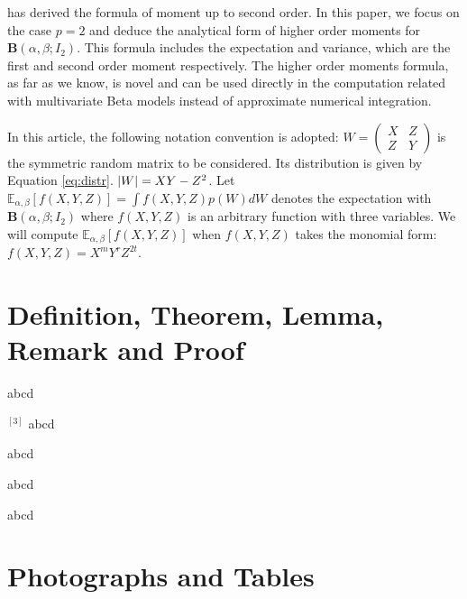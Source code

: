 \documentclass[twoside]{article}%
\DeclarePairedDelimiter\abs{\lvert}{\rvert}
\def\E{\mathbb{E}}
\begin{document}
\cite{konno_1988}
has derived the formula of moment up to second order.
In this paper, we focus on the case $p=2$ and deduce the analytical form of 
higher order moments for $\mathbf{B}(\alpha, \beta; I_2)$.
This formula
includes the expectation and variance, which are the first and second
order moment respectively. The higher order moments formula, as
far as we know, is novel and can be used directly in the computation
related with multivariate Beta models instead of approximate
numerical integration.

In this article, the following notation convention is adopted:
$W=\begin{pmatrix} X & Z \\ Z & Y \end{pmatrix}$ is the symmetric random
matrix to be considered. Its distribution is given by Equation \eqref{eq:distr}.
$\abs{W}=XY-Z^2$.
Let $\E_{\alpha,\beta}[f(X,Y, Z)] = \int f(X,Y,Z)p(W)dW$ denotes the expectation
with $\mathbf{B}(\alpha, \beta;I_2)$ where $f(X, Y, Z)$ is an arbitrary function with three
variables. We will compute $\E_{\alpha,\beta}[f(X,Y, Z)]$
when $f(X,Y,Z)$ takes the monomial form: $f(X,Y,Z)=X^m Y^r Z^{2t}$.

\section{Definition, Theorem, Lemma, Remark and Proof} %

\begin{definition} \quad %
abcd
\end{definition}

\begin{proposition}{\hspace{-1.5mm}}$^{[3]}$ \quad %
abcd
\end{proposition}

\begin{theorem} \quad %
abcd
\end{theorem}

 \quad
abcd

\begin{remark} \quad %
{\rm %
abcd
}
\end{remark}

\section{Photographs and Tables}%
\end{document}
